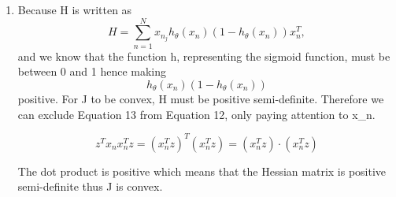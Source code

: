 \documentclass[11pt]{article}
\begin{document}
\begin{enumerate}
        
        \item 
            Because H is written as
            \begin{equation}
                H = \sum_{n=1}^{N} x_{n_{j}}h_{\theta}(x_{n})(1-h_{\theta}(x_{n}))x_{n}^{T} ,
            \end{equation}
            and we know that the function h, representing the sigmoid function, must be between 0 and 1 hence making 
            \begin{equation}
                h_{\theta}(x_{n})(1-h_{\theta}(x_{n}))
            \end{equation}
            positive.
            For J to be convex, H must be positive semi-definite. Therefore we can exclude Equation 13 from Equation 12, only paying attention to x_{n}.
            
            \begin{equation}
                z^{T}x_{n}x_{n}^{T}z = (x_{n}^{T}z)^{T}(x_{n}^{T}z) = (x_{n}^{T}z) \cdot (x_{n}^{T}z)
            \end{equation}
            
            The dot product is positive which means that the Hessian matrix is positive semi-definite thus J is convex.
        
    \end{enumerate}

\newpage
\end{document}
